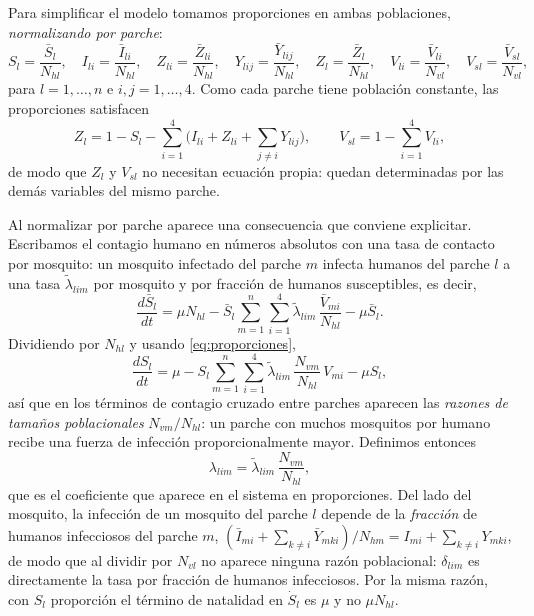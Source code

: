 \documentclass{article}
\numberwithin{equation}{section}
\begin{document}
Para simplificar el modelo tomamos proporciones en ambas poblaciones, \emph{normalizando por parche}:
\begin{equation}\label{eq:proporciones}
S_l=\frac{\bar S_l}{N_{hl}},\quad
I_{li}=\frac{\bar I_{li}}{N_{hl}},\quad
Z_{li}=\frac{\bar Z_{li}}{N_{hl}},\quad
Y_{lij}=\frac{\bar Y_{lij}}{N_{hl}},\quad
Z_{l}=\frac{\bar Z_{l}}{N_{hl}},\quad
V_{li}=\frac{\bar V_{li}}{N_{vl}},\quad
V_{sl}=\frac{\bar V_{sl}}{N_{vl}},
\end{equation}
para $l=1,\dots,n$ e $i,j=1,\dots,4$. Como cada parche tiene población constante, las proporciones satisfacen
\begin{equation}\label{eq:cierre}
Z_l = 1 - S_l - \sum_{i=1}^4\Big(I_{li}+Z_{li}+\sum_{j\neq i} Y_{lij}\Big),
\qquad
V_{sl} = 1-\sum_{i=1}^4 V_{li},
\end{equation}
de modo que $Z_l$ y $V_{sl}$ no necesitan ecuación propia: quedan determinadas por las demás variables del mismo parche.

Al normalizar por parche aparece una consecuencia que conviene explicitar. Escribamos el contagio humano en números absolutos con una tasa de contacto por mosquito: un mosquito infectado del parche $m$ infecta humanos del parche $l$ a una tasa $\tilde\lambda_{lim}$ por mosquito y por fracción de humanos susceptibles, es decir,
\[
\frac{d\bar S_l}{dt}=\mu N_{hl}-\bar S_l\sum_{m=1}^n\sum_{i=1}^4\tilde\lambda_{lim}\,\frac{\bar V_{mi}}{N_{hl}}-\mu\bar S_l .
\]
Dividiendo por $N_{hl}$ y usando \eqref{eq:proporciones},
\[
\frac{dS_l}{dt}=\mu-S_l\sum_{m=1}^n\sum_{i=1}^4\tilde\lambda_{lim}\,\frac{N_{vm}}{N_{hl}}\,V_{mi}-\mu S_l ,
\]
así que en los términos de contagio cruzado entre parches aparecen las \emph{razones de tamaños poblacionales} $N_{vm}/N_{hl}$: un parche con muchos mosquitos por humano recibe una fuerza de infección proporcionalmente mayor. Definimos entonces
\begin{equation}\label{eq:lambda-razon}
\lambda_{lim}=\tilde\lambda_{lim}\,\frac{N_{vm}}{N_{hl}},
\end{equation}
que es el coeficiente que aparece en el sistema en proporciones. Del lado del mosquito, la infección de un mosquito del parche $l$ depende de la \emph{fracción} de humanos infecciosos del parche $m$, $(\bar I_{mi}+\sum_{k\neq i}\bar Y_{mki})/N_{hm}=I_{mi}+\sum_{k\neq i}Y_{mki}$, de modo que al dividir por $N_{vl}$ no aparece ninguna razón poblacional: $\delta_{lim}$ es directamente la tasa por fracción de humanos infecciosos. Por la misma razón, con $S_l$ proporción el término de natalidad en $\dot S_l$ es $\mu$ y no $\mu N_{hl}$.
\end{document}
